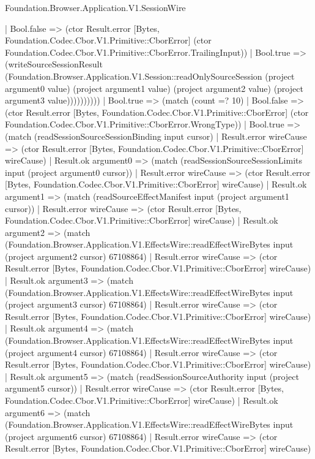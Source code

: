 \begin{lexlean}{Foundation.Browser.Application.V1.SessionWire}
\begin{semanticmodule}
{                  | Bool.false => (ctor Result.error [Bytes, Foundation.Codec.Cbor.V1.Primitive::CborError] (ctor Foundation.Codec.Cbor.V1.Primitive::CborError.TrailingInput))
                  | Bool.true => (writeSourceSessionResult (Foundation.Browser.Application.V1.Session::readOnlySourceSession (project argument0 value) (project argument1 value) (project argument2 value) (project argument3 value))))))))))
    | Bool.true => (match (count =? 10)
      | Bool.false => (ctor Result.error [Bytes, Foundation.Codec.Cbor.V1.Primitive::CborError] (ctor Foundation.Codec.Cbor.V1.Primitive::CborError.WrongType))
      | Bool.true => (match (readSessionSourceSessionBinding input cursor)
        | Result.error wireCause => (ctor Result.error [Bytes, Foundation.Codec.Cbor.V1.Primitive::CborError] wireCause)
        | Result.ok argument0 => (match (readSessionSourceSessionLimits input (project argument0 cursor))
          | Result.error wireCause => (ctor Result.error [Bytes, Foundation.Codec.Cbor.V1.Primitive::CborError] wireCause)
          | Result.ok argument1 => (match (readSourceEffectManifest input (project argument1 cursor))
            | Result.error wireCause => (ctor Result.error [Bytes, Foundation.Codec.Cbor.V1.Primitive::CborError] wireCause)
            | Result.ok argument2 => (match (Foundation.Browser.Application.V1.EffectsWire::readEffectWireBytes input (project argument2 cursor) 67108864)
              | Result.error wireCause => (ctor Result.error [Bytes, Foundation.Codec.Cbor.V1.Primitive::CborError] wireCause)
              | Result.ok argument3 => (match (Foundation.Browser.Application.V1.EffectsWire::readEffectWireBytes input (project argument3 cursor) 67108864)
                | Result.error wireCause => (ctor Result.error [Bytes, Foundation.Codec.Cbor.V1.Primitive::CborError] wireCause)
                | Result.ok argument4 => (match (Foundation.Browser.Application.V1.EffectsWire::readEffectWireBytes input (project argument4 cursor) 67108864)
                  | Result.error wireCause => (ctor Result.error [Bytes, Foundation.Codec.Cbor.V1.Primitive::CborError] wireCause)
                  | Result.ok argument5 => (match (readSessionSourceAuthority input (project argument5 cursor))
                    | Result.error wireCause => (ctor Result.error [Bytes, Foundation.Codec.Cbor.V1.Primitive::CborError] wireCause)
                    | Result.ok argument6 => (match (Foundation.Browser.Application.V1.EffectsWire::readEffectWireBytes input (project argument6 cursor) 67108864)
                      | Result.error wireCause => (ctor Result.error [Bytes, Foundation.Codec.Cbor.V1.Primitive::CborError] wireCause)
}
\end{semanticmodule}
\end{lexlean}
